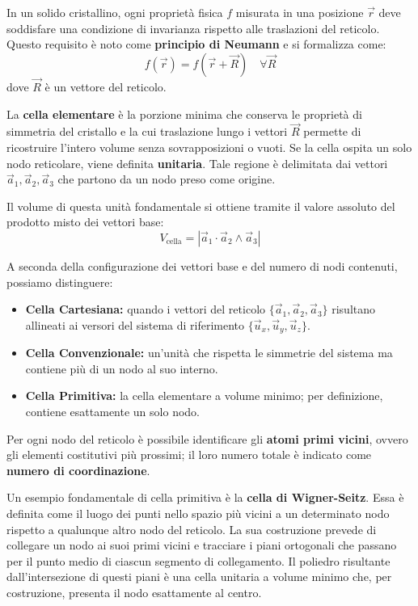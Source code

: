 In un solido cristallino, ogni proprietà fisica \( f \) misurata in una posizione \( \vec{r} \) deve soddisfare una condizione di invarianza rispetto alle traslazioni del reticolo. Questo requisito è noto come \textbf{principio di Neumann} e si formalizza come:
\begin{equation}
    f(\vec{r}) = f(\vec{r} + \vec{R}) \quad \forall \vec{R}
\end{equation}
dove \( \vec{R} \) è un vettore del reticolo.

La \textbf{cella elementare} è la porzione minima che conserva le proprietà di simmetria del cristallo e la cui traslazione lungo i vettori \( \vec{R} \) permette di ricostruire l'intero volume senza sovrapposizioni o vuoti. Se la cella ospita un solo nodo reticolare, viene definita \textbf{unitaria}. Tale regione è delimitata dai vettori \( \vec{a}_1, \vec{a}_2, \vec{a}_3 \) che partono da un nodo preso come origine.

Il volume di questa unità fondamentale si ottiene tramite il valore assoluto del prodotto misto dei vettori base:
\begin{equation}
    V_{\text{cella}} = |\vec{a}_1 \cdot \vec{a}_2 \wedge \vec{a}_3|
\end{equation}

A seconda della configurazione dei vettori base e del numero di nodi contenuti, possiamo distinguere:
\begin{itemize}
    \item \textbf{Cella Cartesiana:} quando i vettori del reticolo \( \{\vec{a}_1, \vec{a}_2, \vec{a}_3\} \) risultano allineati ai versori del sistema di riferimento \( \{\vec{u}_x, \vec{u}_y, \vec{u}_z\} \).
    \item \textbf{Cella Convenzionale:} un'unità che rispetta le simmetrie del sistema ma contiene più di un nodo al suo interno.
    \item \textbf{Cella Primitiva:} la cella elementare a volume minimo; per definizione, contiene esattamente un solo nodo.
\end{itemize}

Per ogni nodo del reticolo è possibile identificare gli \textbf{atomi primi vicini}, ovvero gli elementi costitutivi più prossimi; il loro numero totale è indicato come \textbf{numero di coordinazione}.

Un esempio fondamentale di cella primitiva è la \textbf{cella di Wigner-Seitz}. Essa è definita come il luogo dei punti nello spazio più vicini a un determinato nodo rispetto a qualunque altro nodo del reticolo. La sua costruzione prevede di collegare un nodo ai suoi primi vicini e tracciare i piani ortogonali che passano per il punto medio di ciascun segmento di collegamento. Il poliedro risultante dall'intersezione di questi piani è una cella unitaria a volume minimo che, per costruzione, presenta il nodo esattamente al centro.

